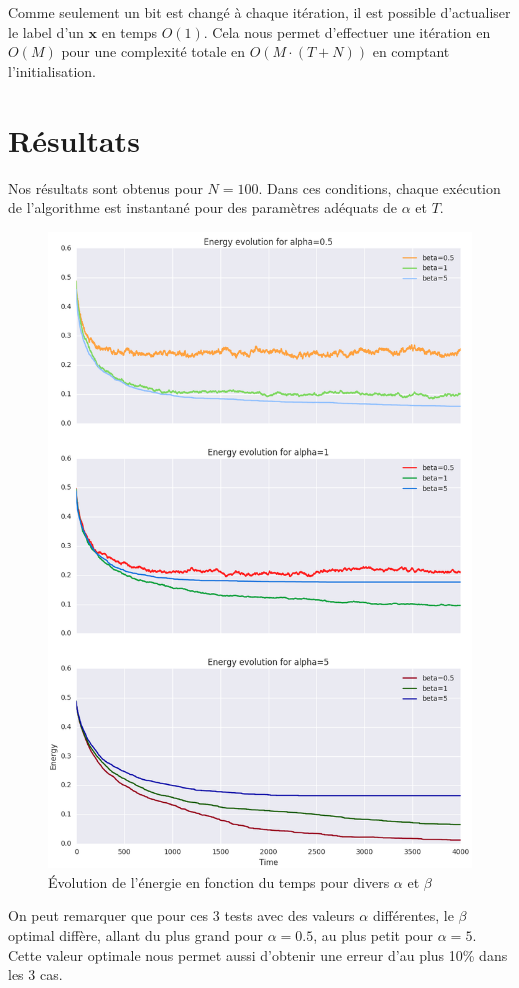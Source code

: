 \documentclass[twocolumn]{article}
\begin{document}
		Comme seulement un bit est changé à chaque itération, il est possible d'actualiser le label d'un $\mathbf{x}$ en temps $O(1)$. Cela nous permet d'effectuer une itération en $O(M)$ pour une complexité totale en $O(M\cdot(T + N))$ en comptant l'initialisation.
		
	\section{Résultats}
		Nos résultats sont obtenus pour $N=100$. Dans ces conditions, chaque exécution de l'algorithme est instantané pour des paramètres adéquats de $\alpha$ et $T$.
		\begin{figure}
			\caption{\label{ex1}Évolution de l'énergie en fonction du temps pour divers $\alpha$ et $\beta$}
			\includegraphics[width=\columnwidth]{../tobekept/ex1_1755923751722050074-r.png}
		\end{figure}
		On peut remarquer que pour ces 3 tests avec des valeurs $\alpha$ différentes, le $\beta$ optimal diffère, allant du plus grand pour $\alpha = 0.5$, au plus petit pour $\alpha = 5$.
		Cette valeur optimale nous permet aussi d'obtenir une erreur d'au plus 10\% dans les 3 cas.
		
\end{document}

